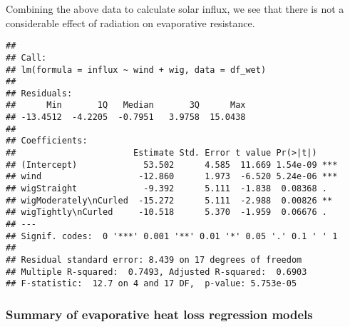 \documentclass[
]{article}
\begin{document}
Combining the above data to calculate solar influx, we see that there is
not a considerable effect of radiation on evaporative resistance.

\begin{verbatim}
## 
## Call:
## lm(formula = influx ~ wind + wig, data = df_wet)
## 
## Residuals:
##      Min       1Q   Median       3Q      Max 
## -13.4512  -4.2205  -0.7951   3.9758  15.0438 
## 
## Coefficients:
##                       Estimate Std. Error t value Pr(>|t|)    
## (Intercept)             53.502      4.585  11.669 1.54e-09 ***
## wind                   -12.860      1.973  -6.520 5.24e-06 ***
## wigStraight             -9.392      5.111  -1.838  0.08368 .  
## wigModerately\nCurled  -15.272      5.111  -2.988  0.00826 ** 
## wigTightly\nCurled     -10.518      5.370  -1.959  0.06676 .  
## ---
## Signif. codes:  0 '***' 0.001 '**' 0.01 '*' 0.05 '.' 0.1 ' ' 1
## 
## Residual standard error: 8.439 on 17 degrees of freedom
## Multiple R-squared:  0.7493, Adjusted R-squared:  0.6903 
## F-statistic:  12.7 on 4 and 17 DF,  p-value: 5.753e-05
\end{verbatim}

\hypertarget{summary-of-evaporative-heat-loss-regression-models}{%
\subsubsection{Summary of evaporative heat loss regression
models}\label{summary-of-evaporative-heat-loss-regression-models}}

 
  \providecommand{\huxb}[2]{\arrayrulecolor[RGB]{#1}\global\arrayrulewidth=#2pt}
  \providecommand{\huxvb}[2]{\color[RGB]{#1}\vrule width #2pt}
  \providecommand{\huxtpad}[1]{\rule{0pt}{#1}}
  \providecommand{\huxbpad}[1]{\rule[-#1]{0pt}{#1}}
\end{document}

